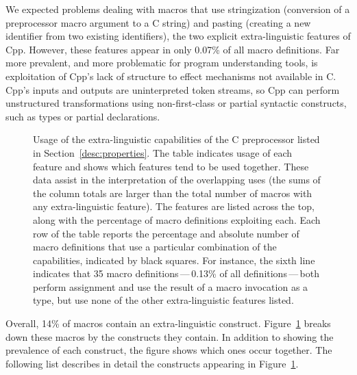 \documentclass[10pt]{article}
\newcommand{\captionsmall}[1]{\caption[]{\small #1}}
\begin{document}

We expected problems dealing with macros that use stringization (conversion
of a preprocessor macro argument to a C string) and pasting (creating a new
identifier from two existing identifiers), the two explicit
extra-linguistic features of Cpp.  However, these features appear in only
0.07\% of all macro definitions.  Far more prevalent, and more problematic
for program understanding tools, is exploitation of Cpp's lack of structure
to effect mechanisms not available in C\@.  Cpp's inputs and outputs are
uninterpreted token streams, so Cpp can perform unstructured transformations
using non-first-class or partial syntactic constructs, such as types or
partial declarations.

\begin{figure}
  \vspace*{.6in}
  {\small\centerline{}}
  
  \captionsmall{Usage of the extra-linguistic capabilities of the C
    preprocessor listed in Section~\ref{desc:properties}.  The table
    indicates usage of each feature and shows which features tend
    to be used together.  These data assist in the interpretation of the overlapping
    uses (the sums of the column totals are larger than the total number of
    macros with any extra-linguistic feature).
    The features are listed across the top, along with the percentage of
    macro definitions exploiting each.  Each row of the table reports the
    percentage and absolute number of macro definitions that use a particular combination
    of the capabilities, indicated by black squares.  For instance, the
    sixth line indicates that 35 macro definitions\,---\,0.13\% of all
    definitions\,---\,both perform assignment and use the result of a macro
    invocation as a type, but use none of the other extra-linguistic
    features listed.}

  \label{fig:subset-properties}
\end{figure}


Overall, 14\% of macros contain an extra-linguistic construct.
Figure~\ref{fig:subset-properties} breaks down these macros by the
constructs they contain.  In addition to showing the prevalence of each
construct, the figure shows which ones occur together.  The following list
describes in detail the constructs appearing in
Figure~\ref{fig:subset-properties}.
\end{document}
